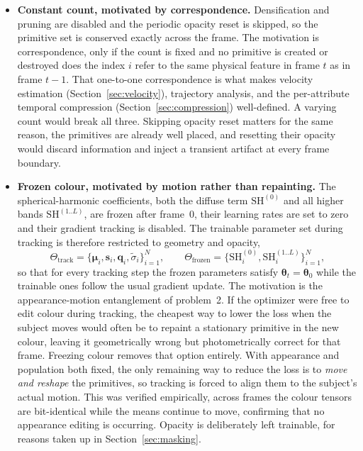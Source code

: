 \begin{itemize}

    \item \textbf{Constant count, motivated by correspondence.} Densification and pruning are
disabled and the periodic opacity reset is skipped, so the primitive set is conserved
exactly across the frame. The motivation is correspondence, only if the count is fixed
and no primitive is created or destroyed does the index $i$ refer to the same physical
feature in frame $t$ as in frame $t-1$. That one-to-one correspondence is what makes
velocity estimation (Section~\ref{sec:velocity}), trajectory analysis, and the
per-attribute temporal compression (Section~\ref{sec:compression}) well-defined. A
varying count would break all three. Skipping opacity reset matters for the same
reason, the primitives are already well placed, and resetting their opacity would
discard information and inject a transient artifact at every frame boundary.

\item \textbf{Frozen colour, motivated by motion rather than repainting.} The
spherical-harmonic coefficients, both the diffuse term $\mathrm{SH}^{(0)}$ and all
higher bands $\mathrm{SH}^{(1..L)}$, are frozen after frame~$0$, their learning
rates are set to zero and their gradient tracking is disabled. The trainable parameter
set during tracking is therefore restricted to geometry and opacity,
\begin{equation}
    \Theta_{\text{track}} = \{\boldsymbol{\mu}_i, \mathbf{s}_i, \mathbf{q}_i, \tilde\sigma_i\}_{i=1}^{N},
    \qquad
    \Theta_{\text{frozen}} = \{\mathrm{SH}^{(0)}_i, \mathrm{SH}^{(1..L)}_i\}_{i=1}^{N},
    \label{eq:trackparams}
\end{equation}
so that for every tracking step the frozen parameters satisfy
$\boldsymbol{\theta}_t = \boldsymbol{\theta}_0$ while the trainable ones follow the
usual gradient update. The motivation is the appearance-motion entanglement of
problem~2. If the optimizer were free to edit colour during tracking, the cheapest way
to lower the loss when the subject moves would often be to repaint a stationary
primitive in the new colour, leaving it geometrically wrong but photometrically
correct for that frame. Freezing colour removes that option entirely. With appearance
and population both fixed, the only remaining way to reduce the loss is to \emph{move
and reshape} the primitives, so tracking is forced to align them to the subject's
actual motion. This was verified empirically, across frames the colour tensors are
bit-identical while the means continue to move, confirming that no appearance editing
is occurring. Opacity is deliberately left trainable, for reasons taken up in
Section~\ref{sec:masking}.


\end{itemize}
